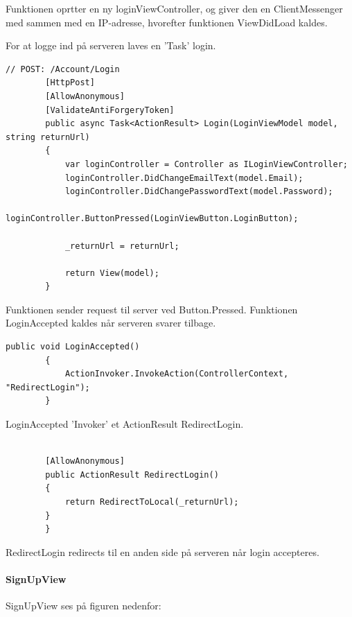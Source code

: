 Funktionen oprtter en ny loginViewController, og giver den en ClientMessenger med sammen med en IP-adresse, hvorefter funktionen ViewDidLoad kaldes.

For at logge ind på serveren laves en 'Task' login.

\begin{lstlisting}[caption=Login, label=code:Login]
 // POST: /Account/Login
        [HttpPost]
        [AllowAnonymous]
        [ValidateAntiForgeryToken]
        public async Task<ActionResult> Login(LoginViewModel model, string returnUrl)
        {
            var loginController = Controller as ILoginViewController;
            loginController.DidChangeEmailText(model.Email);
            loginController.DidChangePasswordText(model.Password);
            loginController.ButtonPressed(LoginViewButton.LoginButton);

            _returnUrl = returnUrl;

            return View(model);
        }
\end{lstlisting} 

Funktionen sender request til server ved Button.Pressed. Funktionen LoginAccepted kaldes når serveren svarer tilbage.

\begin{lstlisting}[caption=LoginAccepted, label=code:LoginAccepted]
public void LoginAccepted()
        {
            ActionInvoker.InvokeAction(ControllerContext, "RedirectLogin");
        }
\end{lstlisting}

LoginAccepted 'Invoker' et ActionResult RedirectLogin.
 
 \begin{lstlisting}[caption=Redirect Login, label=code:redirectlogin]

        [AllowAnonymous]
        public ActionResult RedirectLogin()
        {
            return RedirectToLocal(_returnUrl);
        }
        }
\end{lstlisting}

RedirectLogin redirects til en anden side på serveren når login accepteres.

 
\paragraph{SignUpView}\label{sec: signupview}
SignUpView ses på figuren nedenfor:

